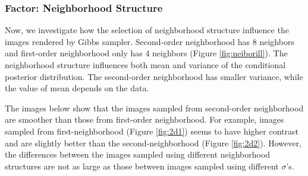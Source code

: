 \subsubsection{Factor: Neighborhood Structure}
Now, we investigate how the selection of neighborhood structure influence the images rendered by Gibbs sampler. 
Second-order neighborhood has 8 neighbors and first-order neighborhood only has 4 neighbors (Figure \ref{fig:neiborill}). 
The neighborhood structure influences both mean and variance of the conditional posterior distribution. 
The second-order neighborhood has smaller variance, while the value of mean depends on the data. 

The images below show that the images sampled from second-order neighborhood are smoother than those from first-order neighborhood. 
For example, images sampled from first-neighborhood (Figure \ref{fig:2d1}) seems to have higher contrast and are slightly better than the second-neighborhood (Figure \ref{fig:2d2}).
However, the differences between the images sampled using different neighborhood structures are not as large as those between images sampled using different $\sigma$'s.
